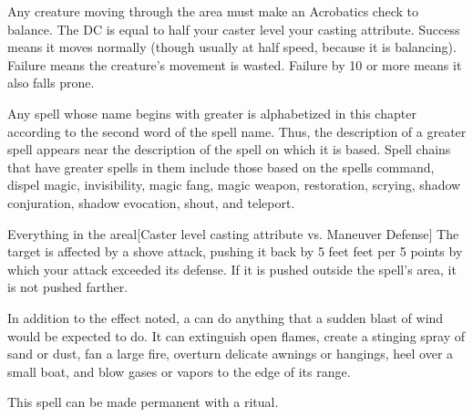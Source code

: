 \begin{spellheader}
    \spelldur{\durshort \dismissable}
\end{spellheader}
\begin{spelleffects}
    \spelleffect Any creature moving through the area must make an Acrobatics check to balance. The DC is equal to half your caster level \add your casting attribute. Success means it moves normally (though usually at half speed, because it is balancing). Failure means the creature's movement is wasted. Failure by 10 or more means it also falls prone.

    \par Any spell whose name begins with greater is alphabetized in this chapter according to the second word of the spell name. Thus, the description of a greater spell appears near the description of the spell on which it is based. Spell chains that have greater spells in them include those based on the spells command, dispel magic, invisibility, magic fang, magic weapon, restoration, scrying, shadow conjuration, shadow evocation, shout, and teleport.
\end{spelleffects}
\begin{spellfooter}
    
\end{spellfooter}

\begin{spellheader}
\end{spellheader}
\begin{spelleffects}
    \begin{spelltarget}{Everything in the area}l[Caster level \add casting attribute vs. Maneuver Defense]
        \spellsuccess The target is affected by a shove attack, pushing it back by 5 feet  feet per 5 points by which your attack exceeded its defense. If it is pushed outside the spell's area, it is not pushed farther.
    \end{spelltarget}
\end{spelleffects}
\begin{spellfooter}
    \spellnotes In addition to the effect noted, a  can do anything that a sudden blast of wind would be expected to do. It can extinguish open flames, create a stinging spray of sand or dust, fan a large fire, overturn delicate awnings or hangings, heel over a small boat, and blow gases or vapors to the edge of its range.

    This spell can be made permanent with a  ritual.
\end{spellfooter}

